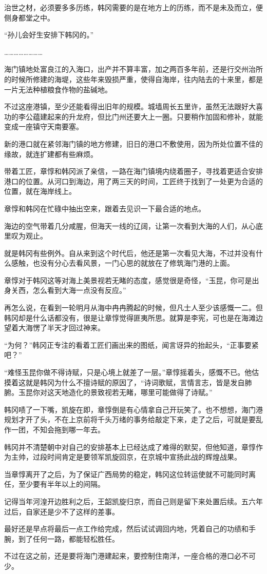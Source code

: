 治世之材，必须要多多历练，韩冈需要的是在地方上的历练，而不是未及而立，便侧身都堂之中。

“孙儿会好生安排下韩冈的。”

……………………

海门镇地处富良江的入海口，出产并不算丰富，加之两百多年前，还是行交州治所的时候所修建的海堤，这些年来毁损严重，使得自海岸，往内陆去的十来里，都是一片无法种植粮食作物的盐碱地。

不过这座港镇，至少还能看得出旧年的规模。城墙周长五里许，虽然无法跟好大喜功的李公蕴建起来的升龙府，但比门州还要大上一圈。只要稍作加固和修补，就能变成一座镇守天南要塞。

新的港口就在紧邻海门镇的地方修建，旧日的港口不敷使用，因为所处位置不佳的缘故，就连扩建都有些麻烦。

带着工匠，章惇和韩冈派了亲信，一路在海门镇境内绕着圈子，寻找着更适合安排港口的位置。从河口到海边，用了两三天的时间，工匠终于找到了一处更为合适的位置，就在海岸线上。

章惇和韩冈在忙碌中抽出空来，跟着去见识一下最合适的地点。

海边的空气带着几分咸腥，但海天一线的辽阔，让第一次看到大海的人们，从心底里叹为观止。

就是韩冈有些例外。自从来到这个时代后，他还是第一次看见大海，不过并没有什么感触，也没有分心去看风景，一门心思的就放在了修筑海门港的上面。

章惇对于韩冈这等对海上美景视若无睹的态度，感觉很是奇怪，“玉昆，你可是出身关西，怎么看到大海一点没有反应。”

再怎么说，在看到一轮明月从海中冉冉腾起的时候，但凡士人至少该感慨一二。但韩冈却是什么话都没有，很是让章惇觉得匪夷所思。就算是李宪，可也是在海滩边望着大海愣了半天才回过神来。

“为何？”韩冈正专注的看着工匠们画出来的图纸，闻言讶异的抬起头，“正事要紧吧？”

“难怪玉昆你做不得诗赋，只是心境上就差了一层。”章惇摇着头，感慨不已。他估摸着这就是韩冈为什么不擅诗赋的原因了，“诗词歌赋，言情言志，皆是发自肺腑。玉昆你对这天地造化的景致视若无睹，哪里可能做得了诗赋。”

韩冈啧了一下嘴，凯旋在即，章惇倒是有心情拿自己开玩笑了。也不想想，海门港规划才开了头，不在上京前将千头万绪的事务给敲定下来，走了之后，可就是要乱作一团，不知会拖到哪一年去。

韩冈并不清楚朝中对自己的安排基本上已经达成了难得的默契，但他知道，章惇作为主帅，过段时间肯定是要领军凯旋回京，在京城中宣扬此战的辉煌战果。

当章惇离开了之后，为了保证广西局势的稳定，韩冈这位转运使就不可能同时离任，至少要有半年以上的间隔。

记得当年河湟开边胜利之后，王韶凯旋归京，而自己则是留下来处置后续。五六年过后，自家还是少不了这样的差事。

最好还是早点将最后一点工作给完成，然后试试调回内地，凭着自己的功绩和手腕，到了任何一路，都能轻松胜任。

不过在这之前，还是要将海门港建起来，要控制住南洋，一座合格的港口必不可少。

